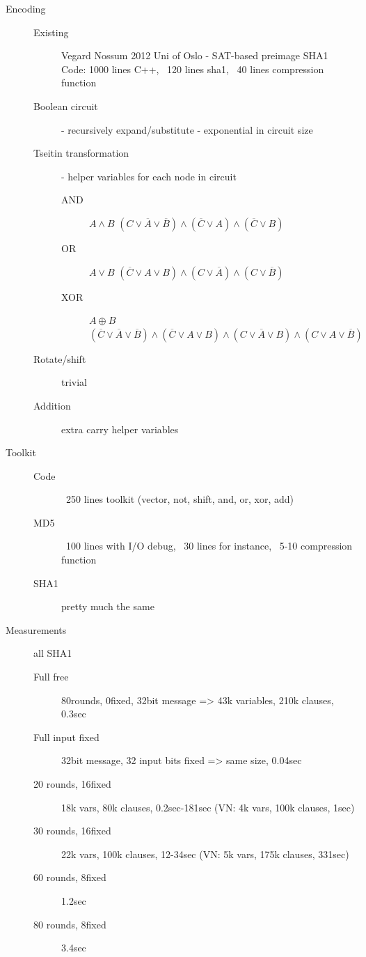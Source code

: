 \documentclass[a4paper]{article}
\begin{document}
\begin{description}
\begin{description}
\begin{description}
\begin{minipage}[t]{\linewidth}
{						}
					\end{minipage}
					\vspace{-5cm}
			\end{description}
	\end{description}
\item[Encoding] \hfill
	\begin{description}
		\item[Existing] Vegard Nossum 2012 Uni of Oslo - SAT-based preimage SHA1 \hfill\\
			Code: 1000 lines C++, ~120 lines sha1, ~40 lines compression function
		\item[Boolean circuit] - recursively expand/substitute - exponential in circuit size
		\item[Tseitin transformation] - helper variables for each node in circuit
			\begin{description}
				\item[AND] $A\land B$ $(C \lor \overline{A} \lor \overline{B}) \land (\overline{C} \lor A) \land (\overline{C} \lor B)$
				\item[OR] $A\lor B$ $(\overline{C} \lor A \lor B) \land (C \lor \overline{A}) \land (C \lor \overline{B})$
				\item[XOR] $A\oplus B$ $(\overline{C} \lor \overline{A} \lor \overline{B}) \land (\overline{C} \lor A \lor B) \land (C \lor \overline{A} \lor B) \land (C \lor A \lor \overline{B})$
			\end{description}
		\item[Rotate/shift] trivial
		\item[Addition] extra carry helper variables
	\end{description}
\item[Toolkit]
	\begin{description}
		\item[Code] ~250 lines toolkit (vector, not, shift, and, or, xor, add)
		\item[MD5] ~100 lines with I/O debug, ~30 lines for instance, ~5-10 compression function
		\item[SHA1] pretty much the same
	\end{description}
\item[Measurements] all SHA1\hfill
	\begin{description}
		\item[Full free] 80rounds, 0fixed, 32bit message => 43k variables, 210k clauses, 0.3sec
		\item[Full input fixed] 32bit message, 32 input bits fixed => same size, 0.04sec
		\item[20 rounds, 16fixed] 18k vars, 80k clauses, 0.2sec-181sec (VN: 4k vars, 100k clauses, 1sec)
		\item[30 rounds, 16fixed] 22k vars, 100k clauses, 12-34sec (VN: 5k vars, 175k clauses, 331sec)
		\item[60 rounds, 8fixed] 1.2sec
		\item[80 rounds, 8fixed] 3.4sec
	\end{description}
\end{description}
\end{document}

